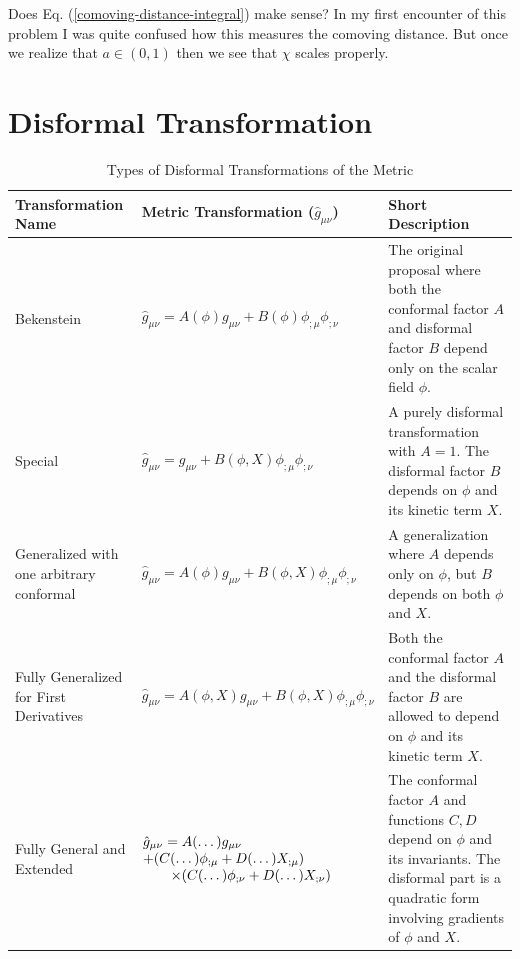 \documentclass[a4paper,11pt]{article}
\begin{document}
Does Eq. (\ref{comoving-distance-integral}) make sense? In my first encounter of this problem I was 
quite confused how this measures the comoving distance. But once we realize that $a \in (0,1)$ then 
we see that $\chi$ scales properly.   



\section{Disformal Transformation}
\newpage
\begin{table}[H]
\centering
\caption{Types of Disformal Transformations of the Metric}
\label{tab:disformal}
\small
\renewcommand{\arraystretch}{1.9}

\begin{tabularx}{\textwidth}{@{} p{4.3cm} p{5.8cm} X @{}}
\toprule
\textbf{Transformation Name} & \textbf{Metric Transformation ($\hat{g}_{\mu \nu}$)} & \textbf{Short Description} \\
\midrule

Bekenstein &
$\hat{g}_{\mu \nu} = A(\phi)g_{\mu \nu} + B(\phi)\phi_{;\mu}\phi_{;\nu}$ &
The original proposal where both the conformal factor $A$ and disformal factor $B$ depend only on the scalar field $\phi$. \\

Special &
$\hat{g}_{\mu \nu} = g_{\mu \nu} + B(\phi, X)\phi_{;\mu}\phi_{;\nu}$ &
A purely disformal transformation with $A=1$. The disformal factor $B$ depends on $\phi$ and its kinetic term $X$. \\

Generalized with one arbitrary conformal &
$\hat{g}_{\mu \nu} = A(\phi)g_{\mu \nu} + B(\phi, X)\phi_{;\mu}\phi_{;\nu}$ &
A generalization where $A$ depends only on $\phi$, but $B$ depends on both $\phi$ and $X$. \\

Fully Generalized for First Derivatives &
$\hat{g}_{\mu \nu} = A(\phi, X)g_{\mu \nu} + B(\phi, X)\phi_{;\mu}\phi_{;\nu}$ &
Both the conformal factor $A$ and the disformal factor $B$ are allowed to depend on $\phi$ and its kinetic term $X$. \\

Fully General and Extended &
$\begin{array}[t]{@{}l@{}}
\hat{g}_{\mu \nu} = A(\dots)g_{\mu \nu} \\ + (C(\dots)\phi_{;\mu} + D(\dots)X_{;\mu}) \\
\hspace*{2em} \times (C(\dots)\phi_{;\nu} + D(\dots)X_{;\nu})
\end{array}$ &
The conformal factor $A$ and functions $C, D$ depend on $\phi$ and its invariants. The disformal part is a quadratic form involving gradients of $\phi$ and $X$. \\


\end{tabularx}
\end{table}
\end{document}
